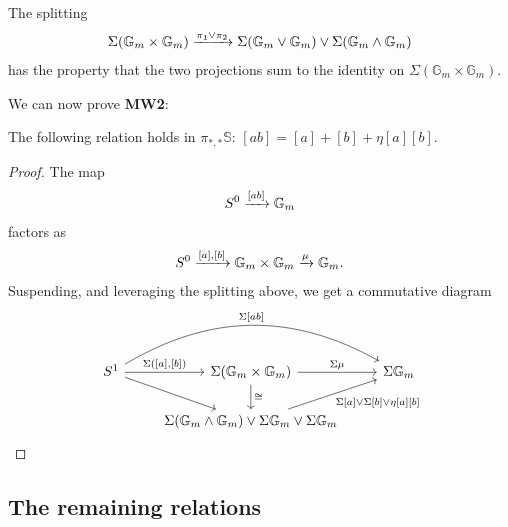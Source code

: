 \documentclass[11pt,openany]{book}
\let\smashprod\wedge
\begin{document}
\begin{proposition} The splitting
\begin{align*}
    \Sigma( \mathbb{G}_m \times \mathbb{G}_m) \xto{\pi_1 \vee \pi_2} \Sigma( \mathbb{G}_m \vee \mathbb{G}_m) \vee \Sigma(\mathbb{G}_m \smashprod \mathbb{G}_m)
\end{align*}
has the property that the two projections sum to the identity on $\Sigma (\mathbb{G}_m \times \mathbb{G}_m)$.
\end{proposition}



We can now prove \textbf{MW2}:

\begin{proposition} The following relation holds in $\pi_{\ast,\ast}\mathbb{S}$: $[ab] = [a]+ [b] + \eta[a][b]$.
\end{proposition}
\begin{proof} The map
\begin{align*}
    S^0 \xrightarrow{[ab]} \mathbb{G}_m
\end{align*}
factors as
\begin{align*}
    S^0 \xrightarrow{[a],[b]} \mathbb{G}_m \times \mathbb{G}_m \xrightarrow{\mu} \mathbb{G}_m.
\end{align*}
Suspending, and leveraging the splitting above, we get a commutative diagram
\[ \begin{tikzcd}
    S^1\rar["{\Sigma([a],[b])}"]\ar[rr,bend left=30,"{\Sigma[ab]}" above]\ar[dr] & \Sigma(\mathbb{G}_m \times \mathbb{G}_m)\rar["\Sigma \mu"]\dar["\cong"] & \Sigma \mathbb{G}_m\\
     & \Sigma(\mathbb{G}_m \smashprod \mathbb{G}_m) \vee \Sigma \mathbb{G}_m\vee \Sigma \mathbb{G}_m\ar[ur,"{\Sigma[a]\vee\Sigma[b]\vee\eta[a][b]}" below right] & 
\end{tikzcd} \]
\end{proof}




\subsection{The remaining relations}
\end{document}
